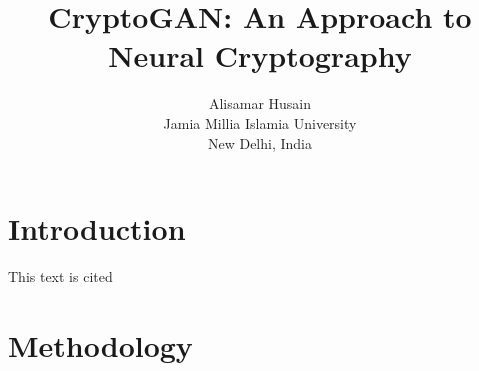 \documentclass[12pt]{article}
\title{CryptoGAN: An Approach to Neural Cryptography}
\author{
  Alisamar Husain\\
  Jamia Millia Islamia University\\
  New Delhi, India
}
\begin{document}
  \maketitle

  \begin{abstract}
    \lipsum[1]
  \end{abstract}
 
  \section{Introduction}
  \lipsum[1]

  This text is cited \cite{visualloss}

  \section{Methodology}
  \lipsum
\end{document}
